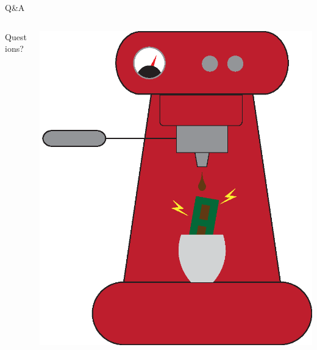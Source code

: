 \documentclass[aspectratio=169, handout]{beamer}
\begin{document}
\section*{}
\begin{frame}{Q\&A}
    \begin{columns}[c]
        \begin{column}{.3\textwidth}
            \begin{center}
                Questions?
            \end{center}
        \end{column}
        \begin{column}{.5\textwidth}
            \includegraphics[width=.8\columnwidth]{graphics/steelbrew.eps}
        \end{column}
    \end{columns}
\end{frame}
\end{document}
